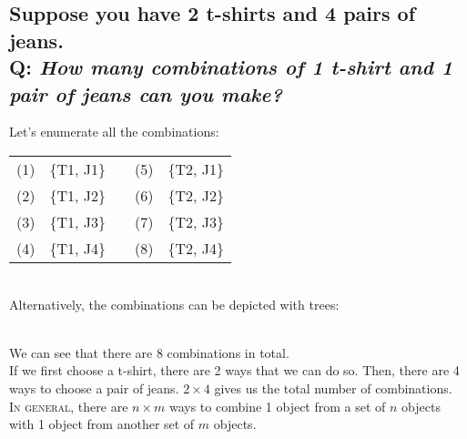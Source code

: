 \documentclass{article}
\begin{document}
\subsection*{{\normalsize Suppose you have 2 t-shirts and 4 pairs of jeans.}\\
Q: {\em How many combinations of 1 t-shirt and 1 pair of jeans can you make?}}
Let's enumerate all the combinations:\\[1ex]
\begin{tabular}{lcclc}
(1)&\{T1, J1\}&&(5)&\{T2, J1\}\\
(2)&\{T1, J2\}&&(6)&\{T2, J2\}\\
(3)&\{T1, J3\}&&(7)&\{T2, J3\}\\
(4)&\{T1, J4\}&&(8)&\{T2, J4\}
\end{tabular}\\[1em]
Alternatively, the combinations can be depicted with trees:\\[1ex]
\quad
{}\\[1em]
We can see that there are 8 combinations in total.\\[1ex]
If we first choose a t-shirt, there are 2 ways that we can do so. Then, there are 4 ways to choose a pair of jeans.
$2\times 4$ gives us the total number of combinations.\\[1em]
\textsc{In general,} there are $n\times m$ ways to combine 1 object from a set of $n$ objects with 1 object from another set of $m$ objects.
\end{document}
